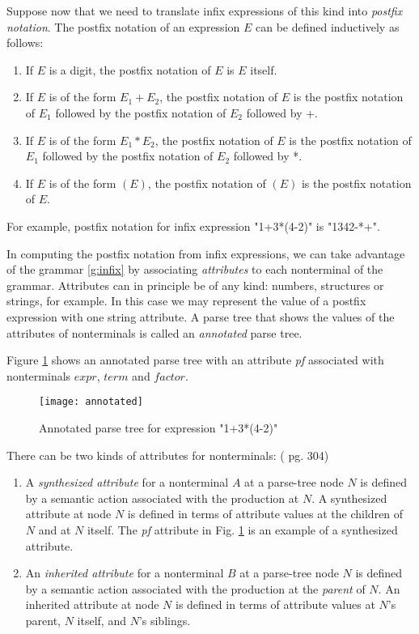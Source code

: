 \documentclass[a4paper,oneside,11pt]{book}
\theoremstyle{definition}
\begin{document}
Suppose now that we need to translate infix expressions of this kind into \emph{postfix notation}.
The postfix notation of an expression $E$ can be defined inductively as follows:

\begin{enumerate}
\item
If $E$ is a digit, the postfix notation of $E$ is $E$ itself.
\item
If $E$ is of the form $E_1 + E_2$, the postfix notation of $E$ is the postfix notation of $E_1$ followed by the postfix notation of $E_2$ followed by +.
\item
If $E$ is of the form $E_1 * E_2$, the postfix notation of $E$ is the postfix notation of $E_1$ followed by the postfix notation of $E_2$ followed by *.
\item
If $E$ is of the form $(E)$, the postfix notation of $(E)$ is the postfix notation of $E$.
\end{enumerate}

For example, postfix notation for infix expression "1+3*(4-2)" is "1342-*+".

In computing the postfix notation from infix expressions, we can take advantage of the grammar \ref{g:infix} by associating
\emph{attributes} to each nonterminal of the grammar. Attributes can in principle be of any kind: numbers, structures or strings, for example.
In this case we may represent the value of a postfix expression with one string attribute.
A parse tree that shows the values of the attributes of nonterminals is called an \emph{annotated} parse tree.

Figure \ref{fig:annotated} shows an annotated parse tree with an attribute \emph{pf} associated with nonterminals $expr$, $term$ and $factor$.

\begin{figure}[htb]
\caption{Annotated parse tree for expression "1+3*(4-2)"}
\label{fig:annotated}
\vspace{0.5cm}
\begin{center}
\texttt{[image: annotated]}
\end{center}
\end{figure}

There can be two kinds of attributes for nonterminals: (\cite{COMPILERS} pg. 304)

\begin{enumerate}
\item
A \emph{synthesized attribute} for a nonterminal $A$ at a parse-tree node $N$ is defined by a semantic action associated with the production at $N$.
A synthesized attribute at node $N$ is defined in terms of attribute values at the children of $N$ and at $N$ itself.
The \emph{pf} attribute in Fig. \ref{fig:annotated} is an example of a synthesized attribute.

\item
An \emph{inherited attribute} for a nonterminal $B$ at a parse-tree node $N$ is defined by a semantic action associated with the production at the
\emph{parent} of $N$. An inherited attribute at node $N$ is defined in terms of attribute values at $N$'s parent, $N$ itself, and $N$'s siblings.
\end{enumerate}
\end{document}
